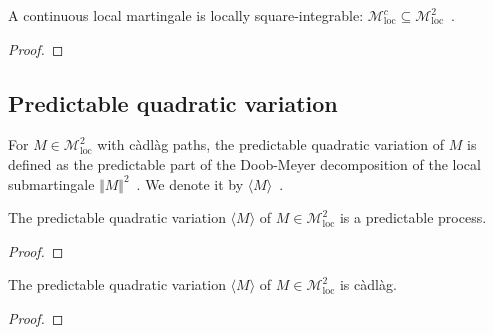 \begin{lemma}\label{lem:IsLocalMartingale.isLocallySquareIntegrable_of_continuous}
A continuous local martingale is locally square-integrable: $\mathcal{M}^c_{\mathrm{loc}} \subseteq \mathcal{M}^2_{\mathrm{loc}}$~.
\end{lemma}

\begin{proof}

\end{proof}



\subsection{Predictable quadratic variation}


\begin{definition}\label{def:quadraticVariation}
  \leanok
For $M \in \mathcal{M}^2_{\mathrm{loc}}$ with càdlàg paths, the predictable
quadratic variation of $M$ is defined as the predictable part of the Doob-Meyer decomposition of the local submartingale $\Vert M \Vert^2$~.
We denote it by $\langle M \rangle$~.
\end{definition}


\begin{lemma}\label{lem:predictable_quadraticVariation}
  \leanok
The predictable quadratic variation $\langle M \rangle$ of $M \in \mathcal{M}^2_{\mathrm{loc}}$ is a predictable process.
\end{lemma}

\begin{proof}\leanok

\end{proof}


\begin{lemma}\label{lem:cadlag_quadraticVariation}
  \leanok
The predictable quadratic variation $\langle M \rangle$ of $M \in \mathcal{M}^2_{\mathrm{loc}}$ is càdlàg.
\end{lemma}

\begin{proof}\leanok

\end{proof}


